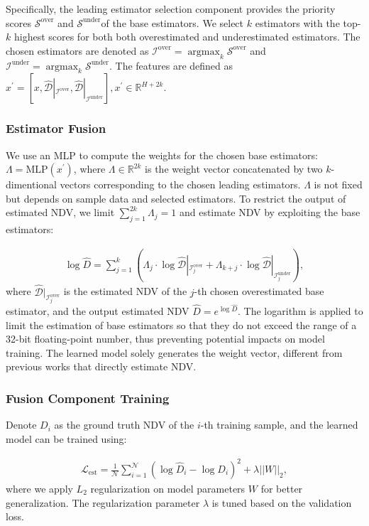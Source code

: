 Specifically, the leading estimator selection component provides the priority scores $\mathcal{S}^{\mathrm{over}}$ and $\mathcal{S}^{\mathrm{under}}$of the base estimators. We select $k$ estimators with the top-$k$ highest scores for both both overestimated and underestimated estimators. The chosen estimators are denoted as $\mathcal{I}^{\mathrm{over}}=\operatorname{argmax}_k\mathcal{S}^{\mathrm{over}}$ and $\mathcal{I}^{\mathrm{under}}=\operatorname{argmax}_k\mathcal{S}^{\mathrm{under}}$. The features are defined as $x^\prime=[x,\hat{\mathcal{D}}|_{\mathcal{I}^{\mathrm{over}}},\hat{\mathcal{D}}|_{\mathcal{I}^{\mathrm{under}}}],x^\prime\in\mathbb{R}^{H+2k}$.



\subsubsection{Estimator Fusion} \label{sec:fusion}
We use an MLP to compute the weights for the chosen base estimators: $\Lambda=\mathrm{MLP}(x^\prime)$, where $\Lambda\in\mathbb{R}^{2k}$ is the weight vector concatenated by two $k$-dimentional vectors corresponding to the chosen leading estimators. $\Lambda$ is not fixed but depends on sample data and selected estimators. To restrict the output of estimated NDV, we limit $\sum_{j=1}^{2k}\Lambda_j=1$ and estimate NDV by exploiting the base estimators:

\begin{align}
    \log \hat{D}=\sum_{j=1}^k(\Lambda_j\cdot\log\hat{\mathcal{D}}|_{\mathcal{I}^\mathrm{over}_j} + \Lambda_{k+j}\cdot\log\hat{\mathcal{D}}|_{\mathcal{I}^\mathrm{under}_j}),
    \label{eq:logd}
\end{align}
where $\hat{\mathcal{D}}|_{\mathcal{I}^\mathrm{over}_j}$ is the estimated NDV of the $j$-th chosen overestimated base estimator, and the output estimated NDV $\hat{D}=e^{\log \hat{D}}$. 
The logarithm is applied to limit the estimation of base estimators so that they do not exceed the range of a 32-bit floating-point number, thus preventing potential impacts on model training.
The learned model solely generates the weight vector, different from previous works that directly estimate NDV.





\subsubsection{Fusion Component Training} Denote $D_i$ as the ground truth NDV of the $i$-th training sample, and the learned model can be trained using:

\begin{align}
    \mathcal{L}_{\mathrm{est}}=\frac{1}{\mathcal{N}}\sum_{i=1}^\mathcal{N}(\log \hat{D}_i-\log D_i)^2+\lambda||W||_2,
    \label{eq:loss-est}
\end{align}
where we apply $L_2$ regularization on model parameters $W$ for better generalization. The regularization parameter $\lambda$ is tuned based on the validation loss.



